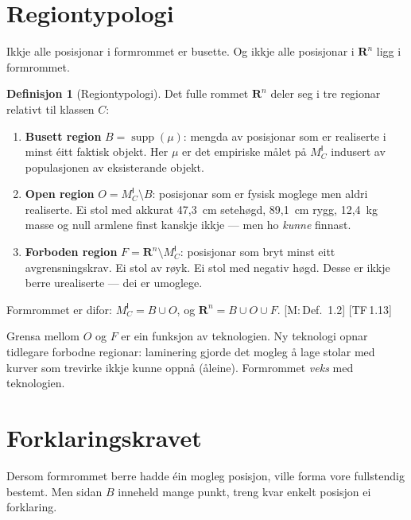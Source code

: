 \documentclass[10pt]{book}
\theoremstyle{definition}
\newtheorem{definisjon}{Definisjon}[chapter]
\theoremstyle{plain}
\theoremstyle{remark}
\newcommand{\MC}{M^{\mathsf{I}}_C}
\providecommand{\Rn}{}
\renewcommand{\Rn}{\mathbf{R}^n}
\DeclareMathOperator{\supp}{supp}
\newcommand{\TF}[1]{\textnormal{[TF\,#1]}}
\newcommand{\Mref}[1]{\textnormal{[M:\,#1]}}
\begin{document}
\section{Regiontypologi}\label{sec:formrom:regionar}

Ikkje alle posisjonar i formrommet er busette. Og ikkje alle posisjonar i $\Rn$ ligg i formrommet.

\begin{definisjon}[Regiontypologi]\label{def:regionar}
Det fulle rommet $\Rn$ deler seg i tre regionar relativt til klassen $C$:
\begin{enumerate}[label=(\roman*)]
  \item \textbf{Busett region} $B = \supp(\mu)$: mengda av posisjonar som er realiserte i minst \'eitt faktisk objekt. Her $\mu$ er det empiriske m\aa let p\aa{} $\MC$ indusert av populasjonen av eksisterande objekt.
  \item \textbf{Open region} $O = \MC \setminus B$: posisjonar som er fysisk moglege men aldri realiserte. Ei stol med akkurat 47,3~cm seteh\o gd, 89,1~cm rygg, 12,4~kg masse og null armlene finst kanskje ikkje --- men ho \emph{kunne} finnast.
  \item \textbf{Forboden region} $F = \Rn \setminus \MC$: posisjonar som bryt minst eitt avgrensningskrav. Ei stol av r\o yk. Ei stol med negativ h\o gd. Desse er ikkje berre urealiserte --- dei er umoglege.
\end{enumerate}
Formrommet er difor: $\MC = B \cup O$, og $\Rn = B \cup O \cup F$. \Mref{Def.~1.2} \TF{1.13}
\end{definisjon}

Grensa mellom $O$ og $F$ er ein funksjon av teknologien. Ny teknologi opnar tidlegare forbodne regionar: laminering gjorde det mogleg \aa{} lage stolar med kurver som trevirke ikkje kunne oppn\aa{} (\aa leine). Formrommet \emph{veks} med teknologien.

\section{Forklaringskravet}\label{sec:formrom:forklaring}

Dersom formrommet berre hadde \'ein mogleg posisjon, ville forma vore fullstendig bestemt. Men sidan $B$ inneheld mange punkt, treng kvar enkelt posisjon ei forklaring.
\end{document}
